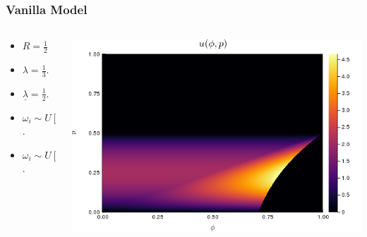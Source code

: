 \documentclass{beamer}
\begin{document}
\begin{frame}
    \frametitle{Vanilla Model}
    \begin{columns}
        \begin{column}{0.18\textwidth}
            \begin{itemize}
                \footnotesize
                \item $R = \frac{1}{2}$    
                \item $\lambda = \frac{1}{3}$.
                \item $\underline{\lambda} = \frac{1}{2}$.
                \item $\omega_i \sim U[0, 1]$.
                \item $\omega_i \sim U[0, 1]$.
            \end{itemize}        
        \end{column}
        \begin{column}{0.88\textwidth}
            \includegraphics[scale=0.48]{vanilla.png}
        \end{column}
    \end{columns}
\end{frame}
\end{document}
